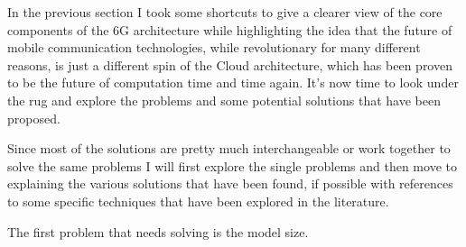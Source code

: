 

In the previous section I took some shortcuts to give a clearer view of the core components of the
6G architecture while highlighting the idea that the future of mobile communication technologies,
while revolutionary for many different reasons, is just a different spin of the Cloud architecture,
which has been proven to be the future of computation time and time again. It's now time to look under the
rug and explore the problems and some potential solutions that have been proposed.

Since most of the solutions are pretty much interchangeable or work together to solve the same
problems I will first explore the single problems and then move to explaining the various solutions
that have been found, if possible with references to some specific techniques that have been
explored in the literature.

The first problem that needs solving is the model size.


